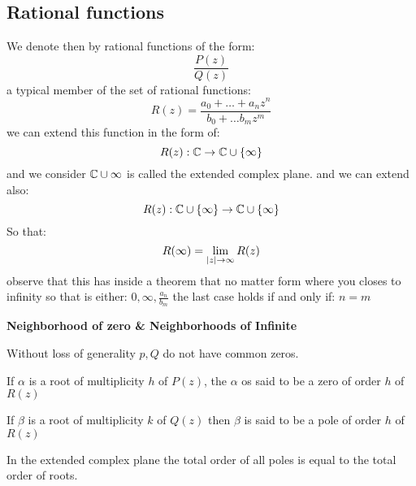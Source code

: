 \subsection*{Rational functions}
We denote then by rational functions of the form: 
\[ \frac{P(z)}{Q(z)} \]
a typical member of the set of rational functions:
\[ R(z)  = \frac{a_0 + \ldots + a_n z^n}{b_0 + \ldots b_m z^m} \]
we can extend this function in the form of:
\[ R(z) : \mathbb{C} \rightarrow \mathbb{C} \cup \left\lbrace \infty \right\rbrace \]
and we consider $ \mathbb{C} \cup \infty $ is called the extended complex plane.
and we can extend also:
\[ R(z) : \mathbb{C} \cup \left\lbrace \infty \right\rbrace \rightarrow \mathbb{C} \cup \left\lbrace \infty \right\rbrace \]
So that:
\[ R(\infty) = \lim\limits_{\left| z \right| \rightarrow \infty} R(z)\]
observe that this has inside a theorem that no matter form where you closes to infinity so that is either: $0 , \infty, \frac{a_n}{b_m}$ the last case holds if and only if: $n = m$

\textbf{Neighborhood of zero \& Neighborhoods of Infinite}

Without loss of generality $p,Q$ do not have common zeros.

\begin{define}
	If $ \alpha $ is a root of multiplicity $h$ of $P(z)$, the $\alpha $ os said to be a zero of order $h$ of $R(z)$
\end{define}
\begin{define}
	If $\beta $ is a root of multiplicity $k$ of $Q(z) $ then $ \beta$ is said to be a pole of order $h$ of $R(z)$
\end{define}

In the extended complex plane the total order of all poles is equal to the total order of roots. 
